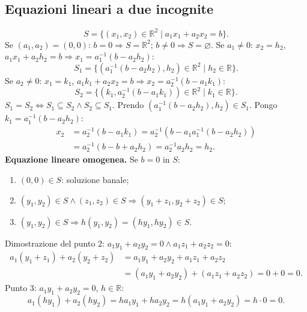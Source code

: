 \documentclass[11pt,a4paper]{article}
\newcommand{\pagina}[1]{\clearpage}
\begin{document}
\subsection*{Equazioni lineari a due incognite}
\[S=\{(x_1,x_2)\in\mathbb R^2\mid a_1x_1+a_2x_2=b\}.\]
Se $(a_1,a_2)=(0,0)$: $b=0\Longrightarrow S=\mathbb R^2$; $b\ne0\Longrightarrow S=\varnothing$.
Se $a_1\ne0$: $x_2=h_2$, $a_1x_1+a_2h_2=b\Longrightarrow x_1=a_1^{-1}(b-a_2h_2)$:
\[S_1=\{(a_1^{-1}(b-a_2h_2),h_2)\in\mathbb R^2\mid h_2\in\mathbb R\}.\]
Se $a_2\ne0$: $x_1=k_1$, $a_1k_1+a_2x_2=b\Longrightarrow x_2=a_2^{-1}(b-a_1k_1)$:
\[S_2=\{(k_1,a_2^{-1}(b-a_1k_1))\in\mathbb R^2\mid k_1\in\mathbb R\}.\]
$S_1=S_2\Longleftrightarrow S_1\subseteq S_2\wedge S_2\subseteq S_1$.
Prendo $(a_1^{-1}(b-a_2h_2),h_2)\in S_1$. Pongo $k_1=a_1^{-1}(b-a_2h_2)$:
\begin{align*}
x_2&=a_2^{-1}(b-a_1k_1)=a_2^{-1}(b-a_1a_1^{-1}(b-a_2h_2))\\
&=a_2^{-1}(b-b+a_2h_2)=a_2^{-1}a_2h_2=h_2.
\end{align*}
\textbf{Equazione lineare omogenea.} Se $b=0$ in $S$:
\begin{enumerate}
\item $(0,0)\in S$: soluzione banale;
\item $(y_1,y_2)\in S\wedge(z_1,z_2)\in S\Longrightarrow(y_1+z_1,y_2+z_2)\in S$;
\item $(y_1,y_2)\in S\Longrightarrow h(y_1,y_2)=(hy_1,hy_2)\in S$.
\end{enumerate}
\pagina{20}
Dimostrazione del punto 2: $a_1y_1+a_2y_2=0\wedge a_1z_1+a_2z_2=0$:
\begin{align*}
a_1(y_1+z_1)+a_2(y_2+z_2)&=a_1y_1+a_2y_2+a_1z_1+a_2z_2\\
&=(a_1y_1+a_2y_2)+(a_1z_1+a_2z_2)=0+0=0.
\end{align*}
Punto 3: $a_1y_1+a_2y_2=0$, $h\in\mathbb R$:
\[a_1(hy_1)+a_2(hy_2)=ha_1y_1+ha_2y_2=h(a_1y_1+a_2y_2)=h\cdot0=0.\]
\end{document}
